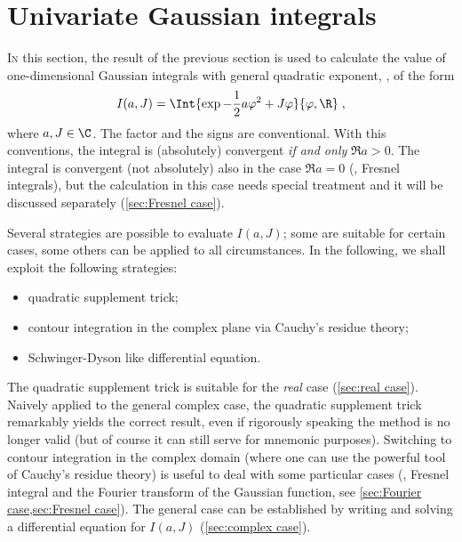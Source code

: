 \section{Univariate Gaussian integrals}
\label{sec:univariate gaussian integrals}


\lettrine{I}{n} this section, the result of the previous section is used to
calculate the value of 
one-dimensional Gaussian integrals with general quadratic exponent, \ie, of the
form
\begin{equation}\label{eq:ZaJ}
   I(a,J) = \Int{\exp{-\frac{1}{2} a \varphi^{2} + J\varphi }}{\varphi, \R}  \; ,
\end{equation}
where $a,J\in\C$. The factor  and the signs are conventional.
With this conventions, the integral is (absolutely) convergent \emph{if and
   only} $\Re a > 0$. The integral is convergent (not
absolutely) also in the case $\Re a = 0$ (\ie, Fresnel integrals), but
the calculation in this case needs special treatment and it will be discussed
separately (\cref{sec:Fresnel case}).

Several strategies are possible to evaluate $I(a,J)$; some are suitable for
certain cases, some others can be applied to all circumstances. In the
following, we shall exploit the following strategies:
\begin{itemize}
   \item quadratic supplement trick;
   \item contour integration in the complex plane via Cauchy's residue theory;
   \item Schwinger-Dyson like differential equation.
\end{itemize}

The quadratic supplement trick is suitable for the \emph{real} case
(\cref{sec:real case}). Naively applied to the general complex case, the
quadratic supplement trick remarkably yields the correct result, even if
rigorously speaking the method is no longer valid (but of course it can still
serve for mnemonic purposes). Switching to contour integration in the complex
domain (where one can use the powerful tool of Cauchy's residue theory) is
useful to deal with some particular cases (\eg, Fresnel integral and the Fourier
transform of the Gaussian function, see \cref{sec:Fourier case,sec:Fresnel
   case}). The general case can be established by writing and solving a
differential equation for $I(a,J)$ (\cref{sec:complex case}).

